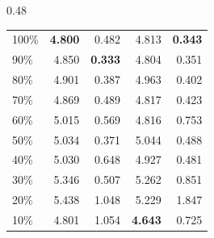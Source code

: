 \begin{table}[ht]
\begin{subtable}{0.48\textwidth}
\begin{tabular}{lrrrr}
\midrule
100\% & \textbf{4.800} & 0.482 & 4.813 & \textbf{0.343} \\
90\%  & 4.850 & \textbf{0.333} & 4.804 & 0.351 \\
80\%  & 4.901 & 0.387 & 4.963 & 0.402 \\
70\%  & 4.869 & 0.489 & 4.817 & 0.423 \\
60\%  & 5.015 & 0.569 & 4.816 & 0.753 \\
50\%  & 5.034 & 0.371 & 5.044 & 0.488 \\
40\%  & 5.030 & 0.648 & 4.927 & 0.481 \\
30\%  & 5.346 & 0.507 & 5.262 & 0.851 \\
20\%  & 5.438 & 1.048 & 5.229 & 1.847 \\
10\%  & 4.801 & 1.054 & \textbf{4.643} & 0.725 \\
\bottomrule
\end{tabular}
\end{subtable}

\vspace{1em}


\end{table}
